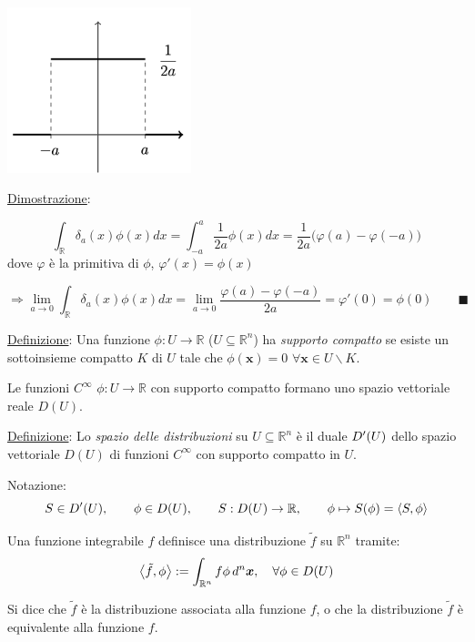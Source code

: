 \documentclass[a4paper,11pt]{report}
\newcommand{\R}{\mathbb{R}}
\newcommand{\Rn}{\mathbb{R}^n}
\newcommand{\x}{\boldsymbol{x}}
\begin{document}
\begin{center}
\includegraphics[width=0.4\textwidth]{immagini/grafico1}
\end{center}

\underline{Dimostrazione}:

\[
\int_\R \delta_a (x)\phi(x) dx= \int_{-a}^{a}\frac{1}{2a}\phi(x) dx = \frac{1}{2a}\big(\varphi(a)-\varphi(-a)\big)
\]
dove $\varphi$ \`e la primitiva di $\phi$, $\varphi'(x)=\phi(x)$

\[
\Rightarrow \lim_{a\to 0}\int_{\R}\delta_a(x)\phi(x)dx=\lim_{a\to 0}\frac{\varphi(a)-\varphi(-a)}{2a}=\varphi'(0)=\phi(0) \qquad\blacksquare
\]

\bigskip

\underline{Definizione}: Una funzione $\phi : U \rightarrow \mathbb{R}$ ($U\subseteq \Rn$) ha \emph{supporto compatto} se esiste un sottoinsieme compatto $K$ di $U$ tale che $\phi(\x)=0$ $\forall \x \in U\smallsetminus K$.

Le funzioni $C^{\infty}$ $\phi :U\rightarrow \mathbb{R}$ con supporto compatto formano uno spazio vettoriale reale $D(U)$.

\medskip

\underline{Definizione}: Lo \emph{spazio delle distribuzioni} su $U \subseteq \mathbb{R}^n$ \`e il duale $D\sp\prime(U)$ dello spazio vettoriale $D(U)$ di funzioni $C^{\infty}$ con supporto compatto in $U$.

Notazione: 
\[
S \in D\sp\prime(U), \qquad
\phi \in D(U), \qquad
S : D(U)\rightarrow \mathbb{R}, \qquad 
\phi \mapsto S(\phi) = \Braket{S,\phi}
\]

Una funzione integrabile $f$ definisce una distribuzione $\tilde{f}$ su $\mathbb{R}^n$ tramite:
\begin{equation}
\Braket{\tilde{f},\phi} := \int_{\Rn} f \phi \,d^{n}\x, \quad\forall \phi \in D(U) 
\end{equation}

Si dice che $\tilde{f}$ \`e la distribuzione associata alla funzione $f$, o che la distribuzione $\tilde{f}$ \`e equivalente alla funzione $f$.
\end{document}
